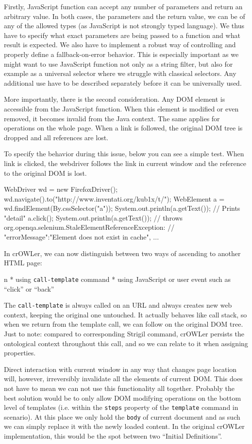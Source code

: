 Firstly, JavaScript function can accept any number of parameters and return an
arbitrary value. In both cases, the parameters and the return value, we can be
of any of the allowed types (as JavaScript is not strongly typed language). We
thus have to specify what exact parameters are being passed to a function and
what result is expected. We also have to implement a robust way of controlling
and properly define a fallback-on-error behavior. This is especially important
as we might want to use JavaScript function not only as a string filter, but also
for example as a universal selector where we struggle with classical selectors. 
Any additional use have to be described separately before it can be universally
used. 

More importantly, there is the second consideration. Any DOM element is
accessible from the JavaScript function. When this element is modified or even
removed, it becomes invalid from the Java context. The same applies for
operations on the whole page. When a link is followed, the original DOM tree 
is dropped and all references are lost. 

To specify the behavior during this issue, below you can see a simple test.
When link is clicked, the webdriver follows the link in current window and the
reference to the original DOM is lost. 

\begtt
WebDriver wd = new FirefoxDriver();
wd.navigate().to("http://www.inventati.org/kub1x/t/");
WebElement a = wd.findElement(By.cssSelector("a"));
System.out.println(a.getText()); // Prints "detail"
a.click();
System.out.println(a.getText());
// throws org.openqa.selenium.StaleElementReferenceException:
// { "errorMessage":"Element does not exist in cache", ... }
\endtt

In crOWLer, we can now distinguish between two ways of ascending to another HTML page: 

\begitems \style n
  * using {\tt call-template} command
  * using JavaScript or user event such as ``click'' or ``back''
\enditems

The {\tt call-template} is always called on an URL and always creates new web
context, keeping the original one untouched. It actually behaves like call
stack, so when we return from the template call, we can follow on the original
DOM tree. Just to note: compared to corresponding Strigil command, crOWLer
persists the ontological context throughout this call, and so we can relate to it
when assigning properties. 

Direct interaction with current window in any way that changes page location
will, however, irreversibly invalidate all the elements of current DOM. This
does not have to mean we can not use this functionality all together. Probably the
best solution would be to only allow DOM modifying operations on the bottom
level of templates (i.e. within the {\tt steps} property of the {\tt template}
command in scenario). At this place we only hold the {\tt body} of current
document and as such we can simply replace it with the newly loaded content. 
In the original crOWLer implementation, this would be the spot between two
``Initial Definitions''. 


